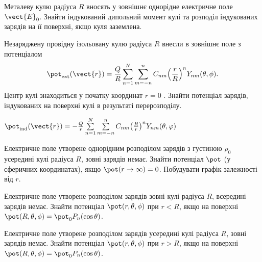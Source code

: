 \begin{problem}
Металеву кулю радіуса $R$ вносять у зовнішнє однорідне електричне поле $\vect{E}_0$. Знайти індукований дипольний момент кулі та розподіл індукованих зарядів на її поверхні, якщо куля заземлена.
\end{problem}

\begin{problem}
Незаряджену провідну ізольовану кулю радіуса $R$ внесли в зовнішнє поле з потенціалом
\[
	\pot_\text{ext}(\vect{r}) = \frac{Q}{R}\sum\limits_{n = 1}^N {\sum\limits_{m =  - n}^n C_{nm}{\left( \frac{r}{R} \right)^n} } Y_{nm}(\theta ,\phi ).
\]
Центр кулі знаходиться у початку координат $r = 0$ . Знайти потенціал зарядів, індукованих на поверхні кулі в результаті перерозподілу.
\begin{solution}
	$\pot_\text{ind}(\vect{r}) =  - \frac{Q}{r}\sum\limits_{n = 1}^N \sum\limits_{m =  - n}^n {C_{nm}{\left( \frac{R}{r} \right)^n}} Y_{nm}(\theta ,\varphi )$
\end{solution}
\end{problem}



\begin{problem}
Електричне поле утворене однорідним розподілом зарядів з густиною $\rho_0$ усередині кулі радіуса $R$, зовні зарядів немає. Знайти потенціал $\pot$ (у сферичних координатах), якщо  $\pot(r\to\infty) = 0$. Побудувати графік залежності від $r$.
\end{problem}

\begin{problem}
Електричне поле утворене розподілом зарядів зовні кулі радіуса $R$, всередині зарядів немає. Знайти потенціал $\pot(r,\theta, \phi)$  при $r<R$, якщо на поверхні $\pot(R,\theta, \phi) = \pot_0 P_n(\cos\theta)$.
\end{problem}

\begin{problem}
Електричне поле утворене розподілом зарядів усередині кулі радіуса $R$, зовні зарядів немає. Знайти потенціал $\pot(r,\theta, \phi)$  при $r>R$, якщо на поверхні $\pot(R,\theta, \phi) = \pot_0P_n(\cos\theta)$.
\end{problem}

